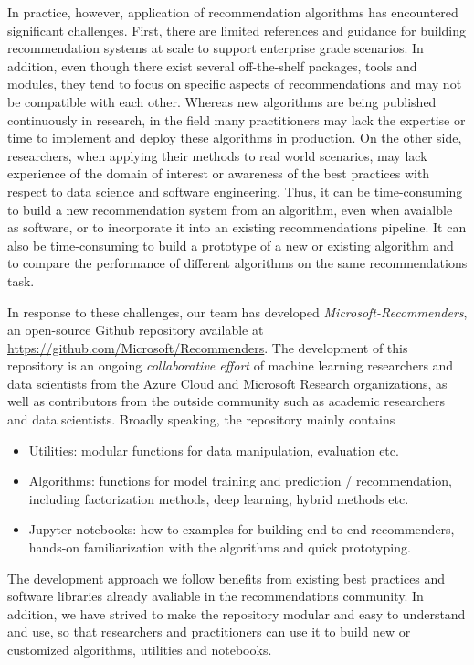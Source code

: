 In practice, however, application of recommendation algorithms has encountered significant challenges. 
First, there are limited references and guidance for building recommendation systems at scale to support
enterprise grade scenarios. In addition, even though there exist several off-the-shelf packages, tools and modules, they tend to focus on specific aspects of recommendations 
and may not be compatible with each other. Whereas new algorithms are being published continuously in research, in the field many practitioners may lack the 
expertise or time to implement and deploy these algorithms in production. On the other side, researchers, when applying their methods to real world scenarios, may lack experience of the domain of interest
or awareness of the best practices with respect to data science and software engineering. Thus, it can be time-consuming to build a new recommendation system from an
algorithm, even when avaialble as software, or to incorporate it into an existing recommendations pipeline. It can also be time-consuming to build a prototype of a new or existing algorithm and to 
compare the performance of different algorithms on the same recommendations task. 

In response to these challenges, our team has developed {\em Microsoft-Recommenders}, an open-source 
Github repository available at \url{https://github.com/Microsoft/Recommenders}.
The development of this repository is an ongoing {\em collaborative effort} of machine learning researchers and data scientists from the 
Azure Cloud and Microsoft Research organizations, as well as contributors from the outside community such as academic researchers and data scientists.
Broadly speaking, the repository mainly contains 
\begin{itemize}
\item
Utilities: modular functions for data manipulation, evaluation etc.
\item
Algorithms: functions for model training and prediction / recommendation, including factorization methods, deep learning, hybrid methods etc.
\item
Jupyter notebooks: how to examples for building end-to-end recommenders, hands-on familiarization with the algorithms and quick prototyping. 
\end{itemize}
The development approach we follow benefits from existing best practices and software libraries already avaliable in the recommendations community.
In addition, we have strived to make the repository modular and easy to understand and use, so that researchers and practitioners can use it to build
new or customized algorithms, utilities and notebooks.

